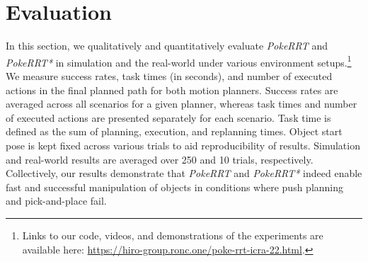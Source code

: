 \section{Evaluation}\label{sec:evaluation}\vspace{-2pt}

% 

In this section, we qualitatively and quantitatively evaluate \textsl{PokeRRT} and \textsl{PokeRRT*} in simulation and the real-world under various environment setups.\footnote{Links to our code, videos, and demonstrations of the experiments are available here: \href{https://hiro-group.ronc.one/poke-rrt-icra-22.html}{https://hiro-group.ronc.one/poke-rrt-icra-22.html}.} We measure success rates, task times (in seconds), and number of executed actions in the final planned path for both motion planners. Success rates are averaged across all scenarios for a given planner, whereas task times and number of executed actions are presented separately for each scenario. Task time is defined as the sum of planning, execution, and replanning times. Object start pose is kept fixed across various trials to aid reproducibility of results. Simulation and real-world results are averaged over 250 and 10 trials, respectively.
%
Collectively, our results demonstrate that \textsl{PokeRRT} and \textsl{PokeRRT*} indeed enable fast and successful manipulation of objects in conditions where push planning and pick-and-place fail.





